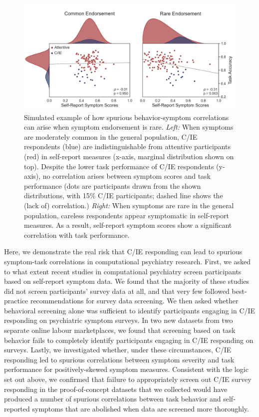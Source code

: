 \documentclass[a4paper,notitlepage,12pt]{article}
\begin{document}
\begin{refsection}[main]
\begin{figure}[t]
\includegraphics[width=16cm]{../figures/main_01.png}
\centering
\captionsetup{width=0.88\textwidth}
\caption{Simulated example of how spurious behavior-symptom correlations can arise when symptom endorsement is rare. \textit{Left:} When symptoms are moderately common in the general population, C/IE respondents (blue) are indistinguishable from attentive participants (red) in self-report measures (x-axis, marginal distribution shown on top). Despite the lower task performance of C/IE respondents (y-axis), no correlation arises between symptom scores and task performance (dots are participants drawn from the shown distributions, with 15\% C/IE participants; dashed line shows the (lack of) correlation.) \textit{Right:} When symptoms are rare in the general population, careless respondents appear symptomatic in self-report measures. As a result, self-report symptom scores show a significant correlation with task performance.}
\label{fig:simulation}
\end{figure}

Here, we demonstrate the real risk that C/IE responding can lead to spurious symptom-task correlations in computational psychiatry research. First, we asked to what extent recent studies in computational psychiatry screen participants based on self-report symptom data. We found that the majority of these studies did not screen participants' survey data at all, and that very few followed best-practice recommendations for survey data screening. We then asked whether behavioral screening alone was sufficient to identify participants engaging in C/IE responding on psychiatric symptom surveys. In two new datasets from two separate online labour marketplaces, we found that screening based on task behavior fails to completely identify participants engaging in C/IE responding on surveys. Lastly, we investigated whether, under these circumstances, C/IE responding led to spurious correlations between symptom severity and task performance for positively-skewed symptom measures. Consistent with the logic set out above, we confirmed that failure to appropriately screen out C/IE survey responding in the proof-of-concept datasets that we collected would have produced a number of spurious correlations between task behavior and self-reported symptoms that are abolished when data are screened more thoroughly.


\end{refsection}
\end{document}
